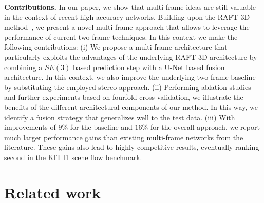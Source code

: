 \documentclass[10pt,twocolumn,letterpaper]{article}
\newcommand{\skipping}[1]{}
\begin{document}
\skipping{
In this context, Maurer and Bruhn 
\cite{Maurer2018_ProFlow} showed recently in the field of optical flow estimation that so called {\em online prediction models} can be a valuable tool not only to exploit temporal information 
but also to exploit information from the actual image sequence at 
{\em run time}. The basic idea of such models is to train an individual small prediction network at run time {\em on the fly for each frame of each sequence} to forecast forward from backward flow, and, based on this prediction, to replace estimates at previously identified unreliable locations, \eg at occlusions. 
Not surprisingly, such a strategy has shown good generalization capabilities across different scenarios due to its inherent adaptivity by training the network on the actual data under consideration \cite{RVC2018}. Furthermore, the prediction network can be used in addition to any baseline method and it is simple to train, since the architecture is comparably lightweight.
}










\medskip
\noindent
\textbf{Contributions.}
In our paper, we show that multi-frame ideas are still valuable in the context of recent high-accuracy networks.
Building upon the RAFT-3D method~\cite{Teed2021_RAFT3D}, we present a novel multi-frame approach that allows to leverage the performance of current two-frame techniques.
In this context we make the following contributions:
(i) We propose a multi-frame architecture that particularly exploits the advantages of the underlying RAFT-3D architecture by combining a $SE(3)$ based prediction step with a U-Net based fusion architecture. In this context, we also improve the underlying two-frame baseline by substituting the employed stereo approach.
(ii) Performing ablation studies and further experiments based on fourfold cross validation, we illustrate the benefits of the different architectural components of our method. In this way, we identify a fusion strategy that generalizes well to the test data.
(iii) With improvements of $9\%$ for the baseline and $16\%$ for the overall approach, we report much larger performance gains than existing multi-frame networks from the literature. These gains also lead to highly competitive results, eventually ranking second in the KITTI scene flow benchmark.



\section{Related work}
\end{document}
